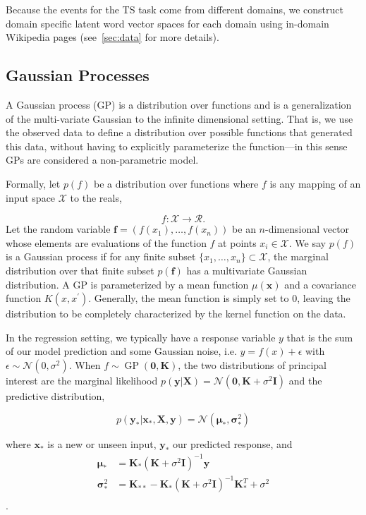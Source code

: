 \documentclass[10pt]{article} \usepackage{url} \usepackage{color}
\begin{document}
Because the events for the TS task come from different domains, we construct
domain specific latent word vector spaces for each domain using in-domain 
Wikipedia pages (see~\cref{sec:data} for more details).

\subsection{Gaussian Processes}

A Gaussian process (GP) is a distribution over functions and is a 
generalization of the multi-variate Gaussian to the infinite dimensional
setting. That is, we use the observed data to define a distribution over 
possible functions that generated this data, without having to explicitly 
parameterize the function---in this sense GPs are considered 
a non-parametric model.

Formally, let $p(f)$ be a distribution over functions where $f$ is any mapping
of an input space $\mathcal{X}$ to the reals,

$$f: \mathcal{X} \rightarrow \mathcal{R}.$$ 
Let the random variable $\mathbf{f} = (f(x_1),\ldots,f(x_n) )$ be
 an $n$-dimensional vector whose elements are evaluations of the function $f$
at points $x_i \in \mathcal{X}$.
We say $p(f)$ is a Gaussian process if for any finite subset 
$\{x_1,\ldots,x_n\} \subset \mathcal{X}$, the marginal distribution over 
that finite subset $p(\mathbf{f})$ has a multivariate Gaussian distribution.
A GP is parameterized by a mean function $\mu(\mathbf{x})$ and a 
covariance function $K(x,x^\prime)$. Generally, the mean function is simply
set to 0, leaving the distribution to be completely characterized by the
kernel function on the data.

In the regression setting, we typically have a response variable $y$ that
is the sum of our model prediction  and 
some Gaussian noise, i.e. $y = f(x) + \epsilon$ with 
$\epsilon \sim \mathcal{N}(0, \sigma^2)$. When
$f \sim \operatorname{GP}(\mathbf{0}, \mathbf{K})$, the
two distributions
of principal interest are the marginal likelihood
$p(\mathbf{y}|\mathbf{X}) = 
\mathcal{N}(\mathbf{0},\mathbf{K} + \sigma^2\mathbf{I})$ and the predictive
distribution,

$$p(\mathbf{y_*}|\mathbf{x_*},\mathbf{X},\mathbf{y}) =
\mathcal{N}(\boldsymbol{\mu}_*, \boldsymbol{\sigma}^2_*) $$

where $\mathbf{x_*}$ is a new or unseen input, $\mathbf{y_*}$ our predicted
response, and
\begin{align*}
\boldsymbol{\mu}_* & = \mathbf{K_*}(\mathbf{K} + \sigma^2\mathbf{I})^{-1}\mathbf{y} \\
\boldsymbol{\sigma}^2_* & 
= \mathbf{K}_{**} - \mathbf{K}_*(\mathbf{K} + \sigma^2\mathbf{I})^{-1}
\mathbf{K}_*^T + \sigma^2\\
\end{align*}.
\end{document}
